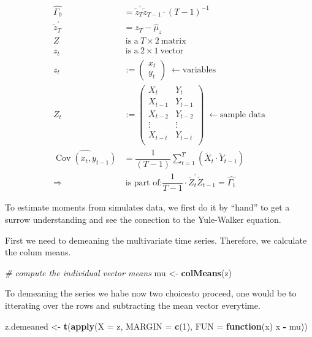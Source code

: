 \documentclass[12pt,a4paper]{article}
\newcommand{\Cov}{\operatorname{Cov}}
\newenvironment{Shaded}{\begin{snugshade}}{\end{snugshade}}
\newcommand{\CommentTok}[1]{\textcolor[rgb]{0.56,0.35,0.01}{\textit{#1}}}
\newcommand{\ControlFlowTok}[1]{\textcolor[rgb]{0.13,0.29,0.53}{\textbf{#1}}}
\newcommand{\DataTypeTok}[1]{\textcolor[rgb]{0.13,0.29,0.53}{#1}}
\newcommand{\DecValTok}[1]{\textcolor[rgb]{0.00,0.00,0.81}{#1}}
\newcommand{\KeywordTok}[1]{\textcolor[rgb]{0.13,0.29,0.53}{\textbf{#1}}}
\newcommand{\NormalTok}[1]{#1}
\newcommand{\OperatorTok}[1]{\textcolor[rgb]{0.81,0.36,0.00}{\textbf{#1}}}
\newcommand{\StringTok}[1]{\textcolor[rgb]{0.31,0.60,0.02}{#1}}
\begin{document}
\begin{align*}
  \widehat{\Gamma_0} & = \tilde{z}_T^{'} \tilde{z}_{T-1} \cdot (T - 1)^{-1} \\
  \tilde{z}_T^{'} & = z_T - \widehat{\mu}_z\\
  Z & \ \text{is a} \ T \times 2 \ \text{matrix}\\
  z_t &\  \text{is a} \ 2 \times 1 \ \text{vector}\\
  z_t & := 
  \begin{pmatrix}
    x_t \\
    y_t
  \end{pmatrix} \; \leftarrow \text{variables}\\
  Z_t & := 
  \begin{pmatrix}
    X_{t} & Y_{t} \\
    X_{t-1} & Y_{t-1} \\
    X_{t-2} & Y_{t-2} \\
    \vdots & \vdots \\
    X_{t-t} & Y_{t-t} \\
  \end{pmatrix} \; \leftarrow \text{sample data}\\
  \widehat{\Cov(x_t, y_{t-1})} & = \dfrac{1}{(T - 1)} \sum_{t = 1}^{T}  \left( \tilde{X}_t \cdot \tilde{Y}_{t- 1} \right)\\
  \Rightarrow & \ \text{is part of:} \dfrac{1}{T -1} \cdot \tilde{Z}_t^{'} \tilde{Z}_{t-1} = \widehat{\Gamma_1}
\end{align*}

To estimate moments from simulates data, we first do it by
\enquote{hand} to get a surrow understanding and see the conection to
the Yule-Walker equation.

First we need to demeaning the multivariate time series. Therefore, we
calculate the colum means.

\begin{Shaded}
\begin{Highlighting}[]
\CommentTok{# compute the individual vector means}
\NormalTok{mu <-}\StringTok{ }\KeywordTok{colMeans}\NormalTok{(z)}
\end{Highlighting}
\end{Shaded}

To demeaning the series we habe now two choicesto proceed, one would be
to itterating over the rows and subtracting the mean vector everytime.

\begin{Shaded}
\begin{Highlighting}[]
\NormalTok{z.demeaned <-}\StringTok{ }\KeywordTok{t}\NormalTok{(}\KeywordTok{apply}\NormalTok{(}\DataTypeTok{X =}\NormalTok{ z, }\DataTypeTok{MARGIN =} \KeywordTok{c}\NormalTok{(}\DecValTok{1}\NormalTok{), }\DataTypeTok{FUN =} \ControlFlowTok{function}\NormalTok{(x) x }\OperatorTok{-}\StringTok{ }\NormalTok{mu))}
\end{Highlighting}
\end{Shaded}
\end{document}

